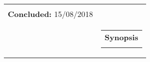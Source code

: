 \begin{titlepage}
\begin{nopagebreak}
{\begin{tabular}{cc}
{\textbf{Pages:}\\

%
\textbf{Concluded:} 15/08/2018\\

\vfill } &
\parbox{7cm}{
  \vspace{.15cm}
  \hfill
  \begin{tabular}{l}
  {\textbf{Synopsis}}\bigskip \\
  \fbox{
    \parbox{6.5cm}{\bigskip
     {\vfill{\small 
     \bigskip}}
     }}
   \end{tabular}}
\end{tabular}} \vspace{1cm}


\end{nopagebreak}
\end{titlepage}
%